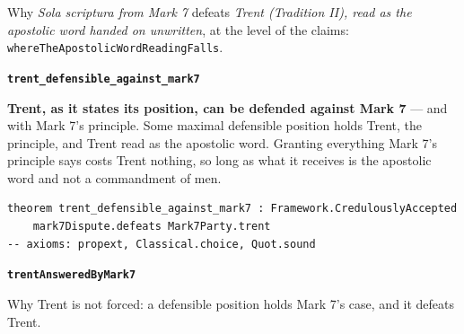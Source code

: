 \documentclass[11pt]{article}
\begin{document}
\noindent Why \emph{Sola scriptura from Mark 7} defeats \emph{Trent (Tradition II), read as the apostolic word handed on unwritten}, at the level of the claims: \texttt{where\allowbreak{}The\allowbreak{}Apostolic\allowbreak{}Word\allowbreak{}Reading\allowbreak{}Falls}.
\par\medskip\noindent\textbf{\texttt{trent\_\allowbreak{}defensible\_\allowbreak{}against\_\allowbreak{}mark7}}\par\nobreak\noindent
\textbf{Trent, as it states its position, can be defended against Mark 7} — and with Mark 7's principle. Some maximal defensible position holds Trent, the principle, and Trent read as the apostolic word. Granting everything Mark 7's principle says costs Trent nothing, so long as what it receives is the apostolic word and not a commandment of men.

{\small\begin{verbatim}
theorem trent_defensible_against_mark7 : Framework.CredulouslyAccepted
    mark7Dispute.defeats Mark7Party.trent
-- axioms: propext, Classical.choice, Quot.sound
\end{verbatim}}
\par\medskip\noindent\textbf{\texttt{trent\allowbreak{}Answered\allowbreak{}By\allowbreak{}Mark7}}\par\nobreak\noindent
Why Trent is not forced: a defensible position holds Mark 7's case, and it defeats Trent.
\end{document}
